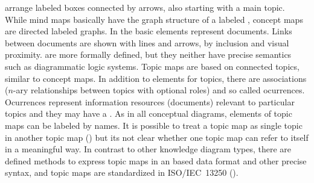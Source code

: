  \cite{Novak2006} arrange labeled
boxes connected by arrows, also starting with a main topic. While mind maps
basically have the graph structure of a labeled , concept maps are
directed labeled graphs. In  \cite{Marshall1995} the
basic elements represent documents. Links between documents are shown with
lines and arrows, by inclusion and visual proximity.  \cite{Pepper2010} are more formally defined, but they neither have
precise semantics such as diagrammatic logic systems. Topic maps are based on
connected topics, similar to concept maps. In addition to elements for topics,
there are associations ($n$-ary relationships between topics with optional
roles) and so called ocurrences. Ocurrences represent information resources
(documents) relevant to particular topics and they may have a .
As in all conceptual diagrams, elements of topic maps can be labeled by names.
It is possible to treat a topic map as single topic in another topic map
() but its not clear whether one topic map can refer to itself
in a meaningful way. In contrast to other knowledge diagram types, there are
defined methods to express topic maps in an  based data format and
other precise syntax, and topic maps are standardized in ISO/IEC~13250
(\citeyear{ISO13250}).







